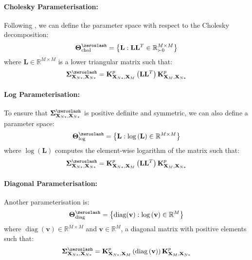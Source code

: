 \documentclass{article}
\newcommand{\diag}{\operatorname{diag}}
\numberwithin{equation}{section}
\begin{document}
\paragraph{Cholesky Parameterisation:}Following \cite{wild2022generalized}, we can define the parameter space with respect to the Cholesky decomposition:
\begin{align}
    \boldsymbol{\Theta}^{\zeroslash}_{\text{chol}} = \left\{\mathbf{L}: \mathbf{L} \mathbf{L}^T \in \mathbb{R}^{M\times M}_{\succ 0}\right\}
\end{align}
where $\mathbf{L} \in \mathbb{R}^{M\times M}$ is a lower triangular matrix such that:
\begin{align}
    \mathbf{\Sigma}^{\zeroslash}_{\mathbf{X}_{N*}, \mathbf{X}_{N*}} = \mathbf{K}^p_{\mathbf{X}_{N*}, \mathbf{X}_M} \left(\mathbf{L} \mathbf{L}^T\right)\mathbf{K}^p_{\mathbf{X}_M, \mathbf{X}_{N*}}
\end{align}

\paragraph{Log Parameterisation:}To ensure that $\mathbf{\Sigma}^{\zeroslash}_{\mathbf{X}_{N*}, \mathbf{X}_{N*}}$ is positive definite and symmetric, we can also define a parameter space:
\begin{align}
    \boldsymbol{\Theta}^{\zeroslash}_{\text{log}} = \left\{\mathbf{L}: \log\left(\mathbf{L}\right)  \in \mathbb{R}^{M\times M}\right\}
\end{align}
where $\log\left(\mathbf{L}\right)$ computes the element-wise logarithm of the matrix such that:
\begin{align}
    \mathbf{\Sigma}^{\zeroslash}_{\mathbf{X}_{N*}, \mathbf{X}_{N*}} = \mathbf{K}^p_{\mathbf{X}_{N*}, \mathbf{X}_M} \left(\mathbf{L} \mathbf{L}^T\right)\mathbf{K}^p_{\mathbf{X}_M, \mathbf{X}_{N*}}
    \label{chol-svgp}
\end{align}

\paragraph{Diagonal Parameterisation:}Another parameterisation is:
\begin{align}
    \boldsymbol{\Theta}^{\zeroslash}_{\text{diag}} = \left\{\diag(\mathbf{v}): \log\left(\mathbf{v}\right)  \in \mathbb{R}^{M}\right\}
    \label{log-svgp}
\end{align}
where $\diag(\mathbf{v}) \in \mathbb{R}^{M\times M}$ and $\mathbf{v} \in \mathbb{R}^M$, a diagonal matrix with positive elements such that:
\begin{align}
    \mathbf{\Sigma}^{\zeroslash}_{\mathbf{X}_{N*}, \mathbf{X}_{N*}} = \mathbf{K}^p_{\mathbf{X}_{N*}, \mathbf{X}_M} \left(\diag\left(\mathbf{v}\right)\right)\mathbf{K}^p_{\mathbf{X}_M, \mathbf{X}_{N*}}
    \label{diagonal-svgp}
\end{align}
\end{document}

